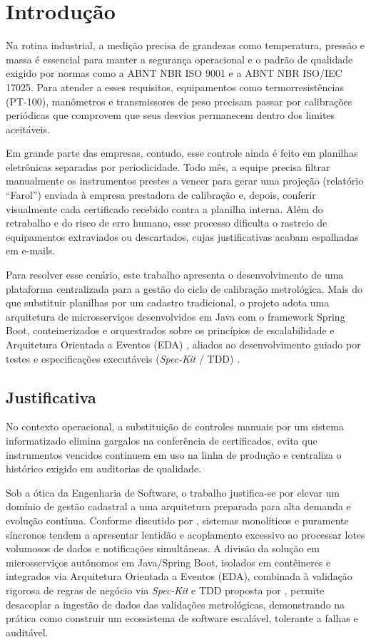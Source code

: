 \chapter{Introdução}

Na rotina industrial, a medição precisa de grandezas como temperatura, pressão e massa é essencial para manter a segurança operacional e o padrão de qualidade exigido por normas como a ABNT NBR ISO 9001 e a ABNT NBR ISO/IEC 17025. Para atender a esses requisitos, equipamentos como termorresistências (PT-100), manômetros e transmissores de peso precisam passar por calibrações periódicas que comprovem que seus desvios permanecem dentro dos limites aceitáveis.

Em grande parte das empresas, contudo, esse controle ainda é feito em planilhas eletrônicas separadas por periodicidade. Todo mês, a equipe precisa filtrar manualmente os instrumentos prestes a vencer para gerar uma projeção (relatório ``Farol'') enviada à empresa prestadora de calibração e, depois, conferir visualmente cada certificado recebido contra a planilha interna. Além do retrabalho e do risco de erro humano, esse processo dificulta o rastreio de equipamentos extraviados ou descartados, cujas justificativas acabam espalhadas em e-mails.

Para resolver esse cenário, este trabalho apresenta o desenvolvimento de uma plataforma centralizada para a gestão do ciclo de calibração metrológica. Mais do que substituir planilhas por um cadastro tradicional, o projeto adota uma arquitetura de microsserviços desenvolvidos em Java com o framework Spring Boot, conteinerizados e orquestrados sobre os princípios de escalabilidade e Arquitetura Orientada a Eventos (EDA) \cite{kleppmann2017}, aliados ao desenvolvimento guiado por testes e especificações executáveis (\textit{Spec-Kit} / TDD) \cite{beck2003}.

\section{Justificativa}

No contexto operacional, a substituição de controles manuais por um sistema informatizado elimina gargalos na conferência de certificados, evita que instrumentos vencidos continuem em uso na linha de produção e centraliza o histórico exigido em auditorias de qualidade.

Sob a ótica da Engenharia de Software, o trabalho justifica-se por elevar um domínio de gestão cadastral a uma arquitetura preparada para alta demanda e evolução contínua. Conforme discutido por , sistemas monolíticos e puramente síncronos tendem a apresentar lentidão e acoplamento excessivo ao processar lotes volumosos de dados e notificações simultâneas. A divisão da solução em microsserviços autônomos em Java/Spring Boot, isolados em contêineres e integrados via Arquitetura Orientada a Eventos (EDA), combinada à validação rigorosa de regras de negócio via \textit{Spec-Kit} e TDD proposta por , permite desacoplar a ingestão de dados das validações metrológicas, demonstrando na prática como construir um ecossistema de software escalável, tolerante a falhas e auditável.

